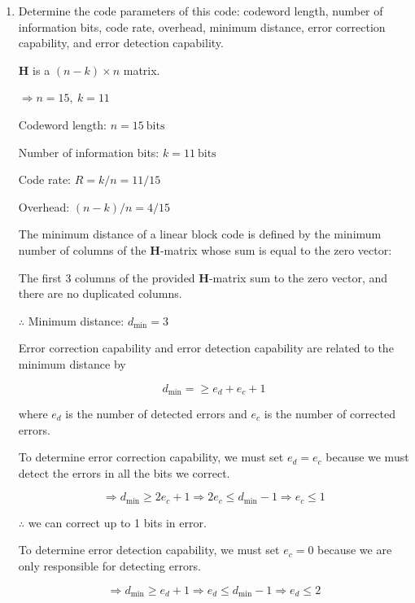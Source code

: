\documentclass[fleqn]{article}
\begin{document}
\begin{enumerate}
		\begin{enumerate}
			\item Determine the code parameters of this code: codeword length, number of information bits, code rate, overhead, minimum distance, error correction capability, and error detection capability.
			
			$\mathbf{H}$ is a $(n-k) \times n$ matrix.

			$\Rightarrow n = 15,\ k = 11$
						
			Codeword length: $n = 15\ \text{bits}$
			
			Number of information bits: $k = 11\ \text{bits}$
			
			Code rate: $R = k/n = 11/15$
			
			Overhead: $(n - k)/n = 4/15$
			
			The minimum distance of a linear block code is defined by the minimum number of columns of the $\mathbf{H}$-matrix whose sum is equal to the zero vector:
			
			The first 3 columns of the provided $\mathbf{H}$-matrix sum to the zero vector, and there are no duplicated columns.
			
			$\therefore$ Minimum distance: $d_\text{min} = 3$
			
			Error correction capability and error detection capability are related to the minimum distance by
			
			\begin{equation*}
				d_{\text{min}} = \geq e_d + e_c + 1
			\end{equation*}
			
			where $e_d$ is the number of detected errors and $e_c$ is the number of corrected errors.
			
			To determine error correction capability, we must set $e_d = e_c$ because we must detect the errors in all the bits we correct.
			
			\begin{equation*}
				\Rightarrow d_{\text{min}} \geq 2e_c + 1 \Rightarrow 2e_c \leq d_{\text{min}} - 1 \Rightarrow e_c \leq 1
			\end{equation*}
			
			$\therefore$ we can correct up to 1 bits in error.
			
			To determine error detection capability, we must set $e_c = 0$ because we are only responsible for detecting errors.
			
			\begin{equation*}
				\Rightarrow d_{\text{min}} \geq e_d + 1 \Rightarrow e_d \leq d_{\text{min}} - 1 \Rightarrow e_d \leq 2
			\end{equation*}
			

\end{enumerate}
\end{enumerate}
\end{document}
